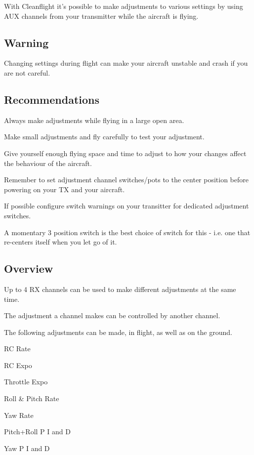 With Cleanflight it's possible to make adjustments to various settings by using A\+U\+X channels from your transmitter while the aircraft is flying.

\subsection*{Warning}

Changing settings during flight can make your aircraft unstable and crash if you are not careful.

\subsection*{Recommendations}


\begin{DoxyItemize}
\item Always make adjustments while flying in a large open area.
\item Make small adjustments and fly carefully to test your adjustment.
\item Give yourself enough flying space and time to adjust to how your changes affect the behaviour of the aircraft.
\item Remember to set adjustment channel switches/pots to the center position before powering on your T\+X and your aircraft.
\item If possible configure switch warnings on your transitter for dedicated adjustment switches.
\item A momentary 3 position switch is the best choice of switch for this -\/ i.\+e. one that re-\/centers itself when you let go of it.
\end{DoxyItemize}

\subsection*{Overview}

Up to 4 R\+X channels can be used to make different adjustments at the same time.

The adjustment a channel makes can be controlled by another channel.

The following adjustments can be made, in flight, as well as on the ground.


\begin{DoxyItemize}
\item R\+C Rate
\item R\+C Expo
\item Throttle Expo
\item Roll \& Pitch Rate
\item Yaw Rate
\item Pitch+\+Roll P I and D
\item Yaw P I and D
\end{DoxyItemize}

